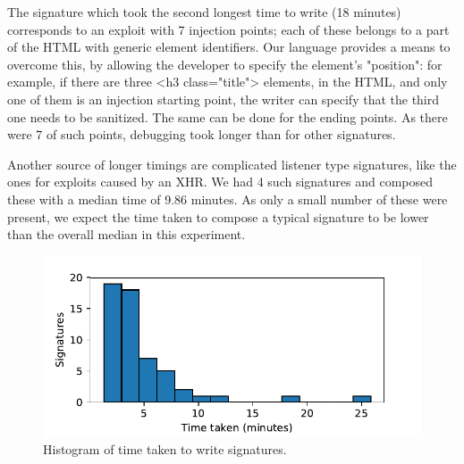 The signature which took the second longest time to write (18 minutes)
corresponds to an exploit with 7 injection points; each of
these belongs to a part of the HTML with generic element
identifiers. Our language provides a means to overcome this, by allowing
the developer to specify the element's "position": for example, if there are
three <h3 class="title"> elements, in the HTML, and only one of them
is an injection starting point, the writer can specify that the third
one needs to be sanitized. The same can be done for the ending points. As
there were 7 of such points, debugging took longer than for
other signatures.

Another source of longer timings are complicated 
listener type signatures, like the ones for exploits caused by an
XHR. We had 4 such signatures and composed these with a median time of 9.86 minutes.
As only a small number of these were present, we expect the time
taken to compose a typical signature to be lower than the overall median in this experiment.

\begin{figure}[h]
	\begin{center}
	\includegraphics[width=\linewidth]{results/signature_times_small.pdf}
	\caption{Histogram of time taken to write signatures.}
	\label{fig:signature_times}
	\end{center}
\end{figure}


